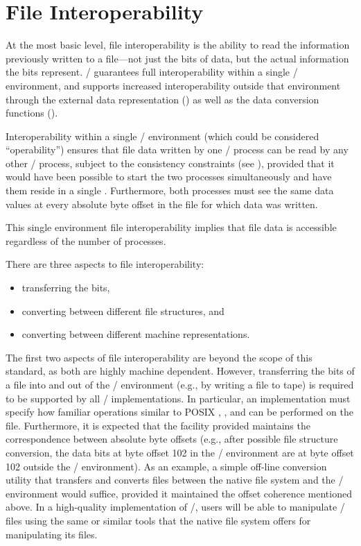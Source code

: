 \section{File Interoperability}
\label{sec:io-file-interop}

At the most basic level, file interoperability is the ability to
read the information previously written to a file---not just the
bits of data, but the actual information the bits represent.
\MPI/ guarantees full interoperability within a single \MPI/ environment,
and supports increased interoperability outside that environment
through the external data representation () as
well as the data conversion functions (). 

Interoperability within a single \MPI/ environment
(which could be considered ``operability'') ensures that file
data written by one \MPI/ process can be read by any other \MPI/ process,
subject to the consistency constraints
(see ),
provided that it would have been possible to start the two processes
simultaneously and have them reside in a single .
Furthermore, both processes must see the same data values at every absolute
byte offset in the file for which data was written.

This single environment file interoperability
implies that file data is accessible
regardless of the number of processes.

There are three aspects to file interoperability:
\begin{itemize}
\item transferring the bits,
\item converting between different file structures, and
\item converting between different machine representations.
\end{itemize}

The first two aspects of file interoperability are beyond the
scope of this standard, as both are highly machine dependent.
However, transferring the bits of a file
into and out of the \MPI/ environment (e.g., by writing a file to tape)
is required to be supported by all \MPI/ implementations.
In particular, an implementation must specify how familiar operations
similar to POSIX , , and  can
be performed on the file.
Furthermore, it is expected that the facility provided maintains
the correspondence between absolute byte offsets (e.g., after
possible file structure conversion, the data bits at byte offset 102
in the \MPI/ environment are at byte offset 102 outside
the \MPI/ environment).
As an example, a simple off-line conversion utility that transfers
and converts files between the native file system and the \MPI/ 
environment would suffice, provided it maintained the offset
coherence mentioned above.
In a high-quality implementation of \MPI/,
users will be able to manipulate \MPI/ files
using the same or similar tools that the native file system offers
for manipulating its files.

